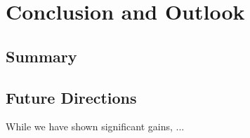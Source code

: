 \chapter{Conclusion and Outlook}
\label{chap:conclusion}



\newpage

\section{Summary}


%


\section{Future Directions}

While we have shown significant gains, ...

